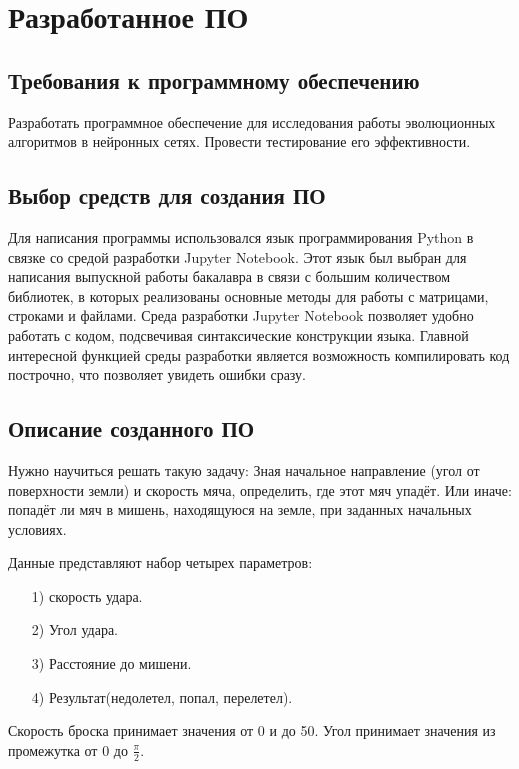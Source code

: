 \newpage

\chapter{Разработанное ПО}

\section{Требования к программному обеспечению}
\indent \indent Разработать программное обеспечение для исследования работы эволюционных алгоритмов в нейронных сетях. Провести тестирование его эффективности.

\section{Выбор средств для создания ПО}

\indent \indent Для написания программы использовался язык программирования Python в связке со средой разработки Jupyter Notebook. Этот язык был выбран для написания выпускной работы бакалавра в связи с большим количеством библиотек, в которых реализованы основные методы для работы с матрицами, строками и файлами.
Среда разработки Jupyter Notebook позволяет удобно работать с кодом, подсвечивая синтаксические конструкции языка. Главной интересной функцией среды разработки является возможность компилировать код построчно, что позволяет увидеть ошибки сразу. 

\section{Описание созданного ПО}

\indent \indent Нужно научиться решать такую задачу:
Зная начальное направление (угол от поверхности земли) и скорость мяча, определить, где этот мяч упадёт. Или иначе: попадёт ли мяч в мишень, находящуюся на земле, при заданных начальных условиях.

Данные представляют набор четырех параметров:
\begin{enumerate}
  \item[1)] скорость удара.
  \item[2)] Угол удара.
  \item[3)] Расстояние до мишени.
  \item[4)] Результат(недолетел, попал, перелетел).
\end{enumerate}

Скорость броска принимает значения от 0 и до 50. Угол принимает значения из промежутка от 0 до $\frac{\pi}{2}$. 

